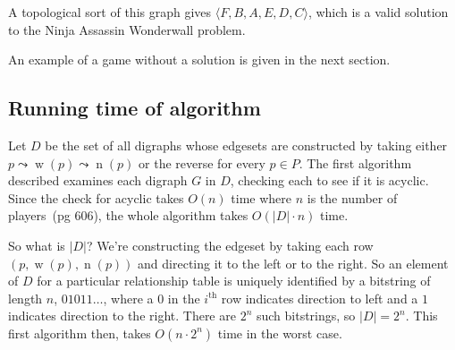 \documentclass[12pt,x11names, rgb]{article}
\DeclareMathOperator{\w}{w}
\DeclareMathOperator{\n}{n}
\begin{document}
\begin{center}

    \end{center}

    A topological sort of this graph gives $\langle F, B, A, E, D, C \rangle$, which is a valid solution to the Ninja Assassin Wonderwall problem. 

    An example of a game without a solution is given in the next section.

\subsection{Running time of algorithm}
\label{sec:run-time}
    Let $D$ be the set of all digraphs whose edgesets are constructed by taking either $p \leadsto \w(p) \leadsto \n(p)$ or the reverse for every $p\in P$. The first algorithm described examines each digraph $G$ in $D$, checking each to see if it is acyclic. Since the check for acyclic takes $O(n)$ time where $n$ is the number of players~\cite{clrs}(pg 606), the whole algorithm takes $O(\lvert D \rvert \cdot n)$ time. 

    So what is $\lvert D \rvert$? We're constructing the edgeset by taking each row $(p, \w(p), \n(p))$ and directing it to the left or to the right. So an element of $D$ for a particular relationship table is uniquely identified by a bitstring of length $n$, $01011\ldots$, where a $0$ in the $i^{\text{th}}$ row indicates direction to left and a $1$ indicates direction to the right. There are $2^n$ such bitstrings, so $\lvert D \rvert = 2^n$. This first algorithm then, takes $O(n \cdot 2^n)$ time in the worst case. 
\end{document}
